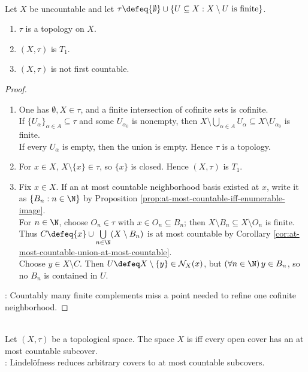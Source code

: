 \begin{counterexample} \label{cex:cofinite-t1-not-first-countable} \\
Let $X$ be uncountable and let $\tau\defeq\{\emptyset\}\cup\{U\subseteq X:X\setminus U\text{ is finite}\}$.
\begin{enumerate}[label=(\roman*)]
\setlength{\itemsep}{0pt}
\item $\tau$ is a topology on $X$.
\item $(X,\tau)$ is $T_1$.
\item $(X,\tau)$ is not first countable.
\end{enumerate}
\begin{proof}
\begin{enumerate}[label=(\roman*)]
\setlength{\itemsep}{0pt}
\item[$(i)$] One has $\emptyset,X\in\tau$, and a finite intersection of cofinite sets is cofinite.\\
If $\{U_\alpha\}_{\alpha\in A}\subseteq\tau$ and some $U_{\alpha_0}$ is nonempty, then $X\setminus\bigcup\limits_{\alpha\in A}U_\alpha\subseteq X\setminus U_{\alpha_0}$ is finite.\\
If every $U_\alpha$ is empty, then the union is empty. Hence $\tau$ is a topology.
\item[$(ii)$] For $x\in X$, $X\setminus\{x\}\in\tau$, so $\{x\}$ is closed. Hence $(X,\tau)$ is $T_1$.
\item[$(iii)$] Fix $x\in X$. If an at most countable neighborhood basis existed at $x$, write it as $\{B_n:n\in\N\}$ by Proposition \ref{prop:at-most-countable-iff-enumerable-image}.\\
For $n\in\N$, choose $O_n\in\tau$ with $x\in O_n\subseteq B_n$; then $X\setminus B_n\subseteq X\setminus O_n$ is finite.\\
Thus $C\defeq\{x\}\cup\bigcup\limits_{n\in\N}(X\setminus B_n)$ is at most countable by Corollary \ref{cor:at-most-countable-union-at-most-countable}.\\
Choose $y\in X\setminus C$. Then $U\defeq X\setminus\{y\}\in\mathcal{N}_X(x)$, but $(\forall n\in\N)\,y\in B_n$, so no $B_n$ is contained in $U$.
\end{enumerate}
: Countably many finite complements miss a point needed to refine one cofinite neighborhood.
\end{proof}
\end{counterexample}

\begin{definition} \label{def:lindelof-space} \\
Let $(X,\tau)$ be a topological space. The space $X$ is  iff every open cover has an at most countable subcover.\\
: Lindel\"ofness reduces arbitrary covers to at most countable subcovers.
\end{definition}

